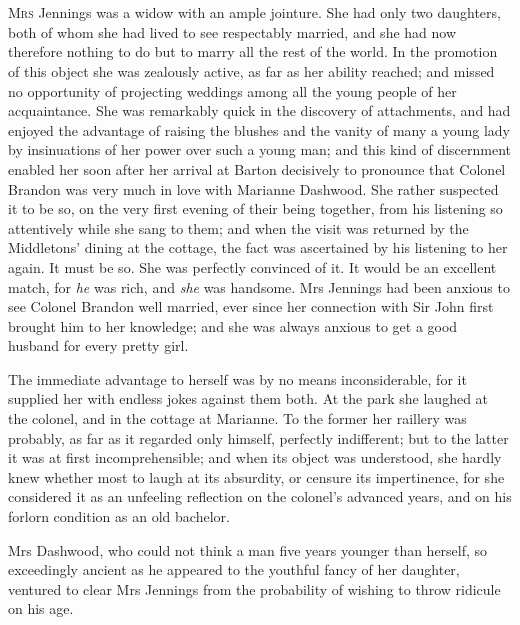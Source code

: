 \chapter[Chapter \thechapter]{}
\lettrine[lines=4,lraise=0.3]{M}{rs} Jennings was a widow with an ample jointure. She had only two daughters, both of whom she had lived to see respectably married, and she had now therefore nothing to do but to marry all the rest of the world. In the promotion of this object she was zealously active, as far as her ability reached; and missed no opportunity of projecting weddings among all the young people of her acquaintance. She was remarkably quick in the discovery of attachments, and had enjoyed the advantage of raising the blushes and the vanity of many a young lady by insinuations of her power over such a young man; and this kind of discernment enabled her soon after her arrival at Barton decisively to pronounce that Colonel Brandon was very much in love with Marianne Dashwood. She rather suspected it to be so, on the very first evening of their being together, from his listening so attentively while she sang to them; and when the visit was returned by the Middletons’ dining at the cottage, the fact was ascertained by his listening to her again. It must be so. She was perfectly convinced of it. It would be an excellent match, for \textit{he} was rich, and \textit{she} was handsome. Mrs Jennings had been anxious to see Colonel Brandon well married, ever since her connection with Sir John first brought him to her knowledge; and she was always anxious to get a good husband for every pretty girl.

The immediate advantage to herself was by no means inconsiderable, for it supplied her with endless jokes against them both. At the park she laughed at the colonel, and in the cottage at Marianne. To the former her raillery was probably, as far as it regarded only himself, perfectly indifferent; but to the latter it was at first incomprehensible; and when its object was understood, she hardly knew whether most to laugh at its absurdity, or censure its impertinence, for she considered it as an unfeeling reflection on the colonel’s advanced years, and on his forlorn condition as an old bachelor.

Mrs Dashwood, who could not think a man five years younger than herself, so exceedingly ancient as he appeared to the youthful fancy of her daughter, ventured to clear Mrs Jennings from the probability of wishing to throw ridicule on his age.

